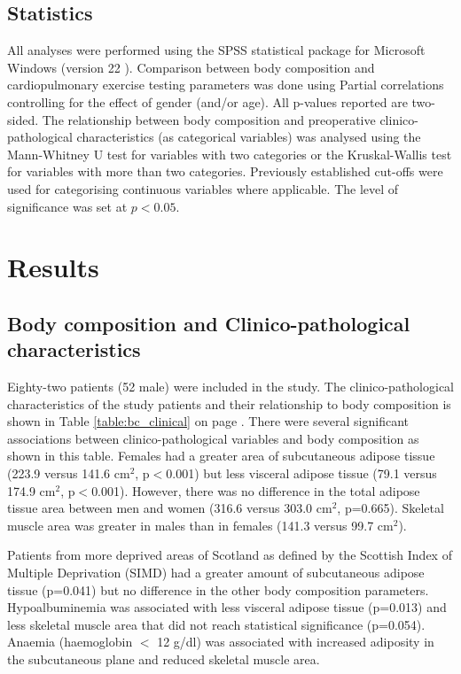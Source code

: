 \subsection{Statistics}

All analyses were performed using the SPSS statistical package for Microsoft Windows (version 22 ). 
Comparison between body composition and cardiopulmonary exercise testing parameters was done using Partial correlations controlling for the effect of gender (and/or age). 
All p-values reported are two-sided. 
The relationship between body composition and preoperative clinico-pathological characteristics (as categorical variables) was analysed using the Mann-Whitney U test for variables with two categories or the Kruskal-Wallis test for variables with more than two categories. 
Previously established cut-offs were used for categorising continuous variables where applicable. 
The level of significance was set at $p<0.05$.

\clearpage
\section{Results}

\subsection{Body composition and Clinico-pathological characteristics}
Eighty-two patients (52 male) were included in the study. 
The clinico-pathological characteristics of the study patients and their relationship to body composition is shown in Table \ref{table:bc_clinical} on page \pageref{table:bc_clinical}. 
There were several significant associations between clinico-pathological variables and body composition as shown in this table. 
Females had a greater area of subcutaneous adipose tissue (223.9 versus 141.6 cm$^2$, p$<$0.001) but less visceral adipose tissue (79.1 versus 174.9 cm$^2$, p$<$0.001).
However, there was no difference in the total adipose tissue area between men and women (316.6 versus 303.0 cm$^2$, p=0.665).
Skeletal muscle area was greater in males than in females (141.3 versus 99.7 cm$^2$).

Patients from more deprived areas of Scotland as defined by the Scottish Index of Multiple Deprivation (SIMD) had a greater amount of subcutaneous adipose tissue (p=0.041) but no difference in the other body composition parameters.
Hypoalbuminemia was associated with less visceral adipose tissue (p=0.013) and less skeletal muscle area that did not reach statistical significance (p=0.054). 
Anaemia (haemoglobin $<$ 12 g/dl) was associated with increased adiposity in the subcutaneous plane and reduced skeletal muscle area. 
	

